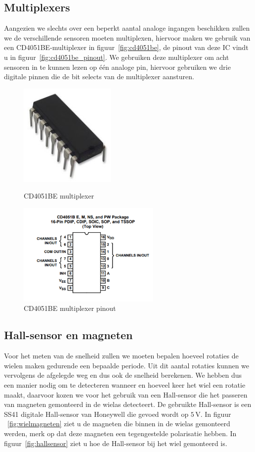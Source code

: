 \subsection{Multiplexers}
Aangezien we slechts over een beperkt aantal analoge ingangen beschikken zullen we de verschillende sensoren moeten multiplexen, hiervoor maken we gebruik van een CD4051BE-multiplexer in figuur~\vref{fig:cd4051be}, de pinout van deze IC vindt u in figuur~\vref{fig:cd4051be_pinout}. We gebruiken deze multiplexer om acht sensoren in te kunnen lezen op \'e\'en analoge pin, hiervoor gebruiken we drie digitale pinnen die de bit selects van de multiplexer aansturen.

\begin{figure}[H]
	\centering
	\begin{minipage}[b]{0.4\textwidth}
		\includegraphics[height=5cm]{cd4051be.png}
		\caption{CD4051BE multiplexer}
		\label{fig:cd4051be}
	\end{minipage}
	\hfill
	\begin{minipage}[b]{0.4\textwidth}
		\includegraphics[height=5cm]{cd4051be_pinout.png}
		\caption{CD4051BE multiplexer pinout}
		\label{fig:cd4051be_pinout}
	\end{minipage}
\end{figure}
\subsection{Hall-sensor en magneten}\label{sec:hall-sensor}
Voor het meten van de snelheid zullen we moeten bepalen hoeveel rotaties de wielen maken gedurende een bepaalde periode. Uit dit aantal rotaties kunnen we vervolgens de afgelegde weg en dus ook de snelheid berekenen. We hebben dus een manier nodig om te detecteren wanneer en hoeveel keer het wiel een rotatie maakt, daarvoor kozen we voor het gebruik van een Hall-sensor die het passeren van magneten gemonteerd in de wielas detecteert. De gebruikte Hall-sensor is een SS41 digitale Hall-sensor van Honeywell die gevoed wordt op $5\,\mathrm{V}$. In figuur ~\vref{fig:wielmagneten} ziet u de magneten die binnen in de wielas gemonteerd werden, merk op dat deze magneten een tegengestelde polarisatie hebben. In figuur~\vref{fig:hallsensor} ziet u hoe de Hall-sensor bij het wiel gemonteerd is.

